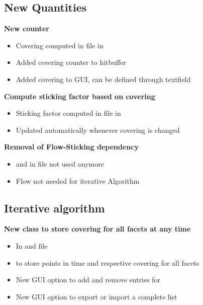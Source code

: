 \subsection{New Quantities}
\textbf{New counter }
\begin{itemize}[noitemsep,topsep=0pt]
\item Covering computed in  file in 
\item Added covering counter to hitbuffer
\item Added covering to GUI, can be defined through textfield
\end{itemize}
\bigskip
\textbf{Compute sticking factor based on covering}
\begin{itemize}[noitemsep,topsep=0pt]
\item Sticking factor computed in  file in 
\item Updated automatically whenever covering is changed
\end{itemize}
\bigskip
\textbf{Removal of Flow-Sticking dependency}
\begin{itemize}[noitemsep,topsep=0pt]
\item {} and  in  file not used anymore
\item Flow not needed for iterative Algorithm
\end{itemize}

\subsection{Iterative algorithm}
\textbf{New class to store covering for all facets at any time} 
\begin{itemize}[noitemsep,topsep=0pt]
\item In  and  file
\item {} to store points in time and respective covering for all facets
\item New GUI option to add and remove entries for 
\item New GUI option to export or import a complete list
\end{itemize}
\bigskip
